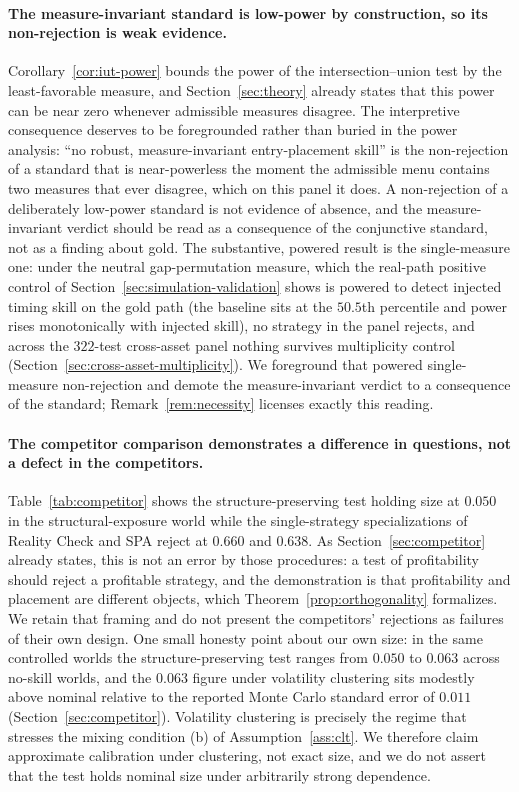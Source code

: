 \documentclass[preprint,12pt]{elsarticle}
\theoremstyle{definition}
\begin{document}
\paragraph{The measure-invariant standard is low-power by construction, so its
non-rejection is weak evidence.} Corollary~\ref{cor:iut-power} bounds the power of the
intersection--union test by the least-favorable measure, and Section~\ref{sec:theory}
already states that this power can be near zero whenever admissible measures disagree.
The interpretive consequence deserves to be foregrounded rather than buried in the
power analysis: ``no robust, measure-invariant entry-placement skill'' is the
non-rejection of a standard that is near-powerless the moment the admissible menu
contains two measures that ever disagree, which on this panel it does. A non-rejection
of a deliberately low-power standard is not evidence of absence, and the measure-
invariant verdict should be read as a consequence of the conjunctive standard, not as a
finding about gold. The substantive, powered result is the single-measure one: under
the neutral gap-permutation measure, which the real-path positive control of
Section~\ref{sec:simulation-validation} shows is powered to detect injected timing skill
on the gold path (the baseline sits at the $50.5$th percentile and power rises
monotonically with injected skill), no strategy in the panel rejects, and across the
$322$-test cross-asset panel nothing survives multiplicity control
(Section~\ref{sec:cross-asset-multiplicity}). We foreground that powered single-measure
non-rejection and demote the measure-invariant verdict to a consequence of the standard;
Remark~\ref{rem:necessity} licenses exactly this reading.

\paragraph{The competitor comparison demonstrates a difference in questions, not a
defect in the competitors.} Table~\ref{tab:competitor} shows the structure-preserving
test holding size at $0.050$ in the structural-exposure world while the single-strategy
specializations of Reality Check and SPA reject at $0.660$ and $0.638$. As
Section~\ref{sec:competitor} already states, this is not an error by those procedures:
a test of profitability should reject a profitable strategy, and the demonstration is
that profitability and placement are different objects, which
Theorem~\ref{prop:orthogonality} formalizes. We retain that framing and do not
present the competitors' rejections as failures of their own design. One small honesty
point about our own size: in the same controlled worlds the structure-preserving test
ranges from $0.050$ to $0.063$ across no-skill worlds, and the $0.063$ figure under
volatility clustering sits modestly above nominal relative to the reported Monte Carlo
standard error of $0.011$ (Section~\ref{sec:competitor}). Volatility clustering is
precisely the regime that stresses the mixing condition (b) of
Assumption~\ref{ass:clt}. We therefore claim approximate calibration under clustering,
not exact size, and we do not assert that the test holds nominal size under arbitrarily
strong dependence.
\end{document}
